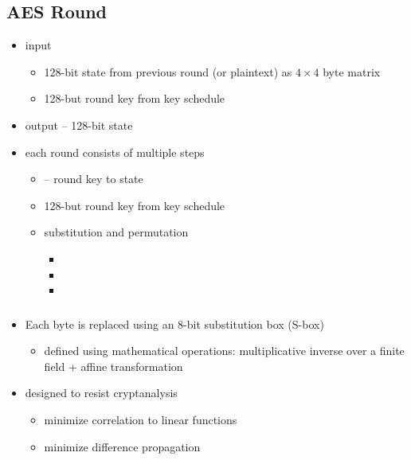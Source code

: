 \documentclass[draft]{article}
\begin{document}
\subsection{AES Round}
\begin{itemize}[nosep]
    \item input
          \begin{itemize}[nosep]
              \item 128-bit state from previous round (or plaintext) as $4\times4$ byte matrix
              \item 128-but round key from key schedule
          \end{itemize}
    \item output -- 128-bit state
    \item each round consists of multiple steps
          \begin{itemize}[nosep]
              \item {} --  round key to state
              \item 128-but round key from key schedule
              \item substitution and permutation
                    \begin{itemize}[nosep]
                        \item {}
                        \item {}
                        \item {}
                    \end{itemize}
          \end{itemize}
\end{itemize}
\subsubsection*{}
\begin{itemize}[nosep]
    \item Each byte is replaced using an 8-bit substitution box (S-box)
          \begin{itemize}[nosep]
              \item defined using mathematical operations: multiplicative inverse over a finite field + affine transformation
          \end{itemize}
    \item designed to resist cryptanalysis
          \begin{itemize}[nosep]
              \item minimize correlation to linear functions
              \item minimize difference propagation
          \end{itemize}
\end{itemize}
\end{document}
